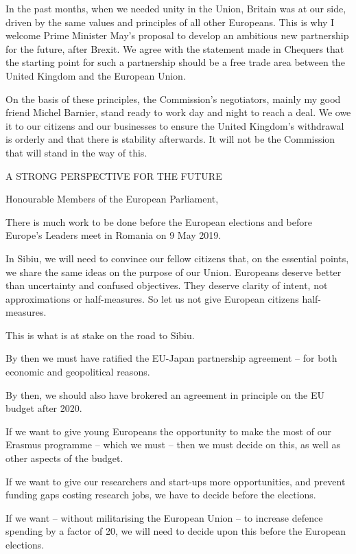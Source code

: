 \documentclass[a4paper,11pt]{article}
\begin{document}
In the past months, when we needed unity in the Union, Britain was at our side, driven by the same values and principles of all other Europeans. This is why I welcome Prime Minister May's proposal to develop an ambitious new partnership for the future, after Brexit. We agree with the statement made in Chequers that the starting point for such a partnership should be a free trade area between the United Kingdom and the European Union.

On the basis of these principles, the Commission's negotiators, mainly my good friend Michel Barnier, stand ready to work day and night to reach a deal. We owe it to our citizens and our businesses to ensure the United Kingdom's withdrawal is orderly and that there is stability afterwards. It will not be the Commission that will stand in the way of this.

 

A STRONG PERSPECTIVE FOR THE FUTURE

Honourable Members of the European Parliament,

There is much work to be done before the European elections and before Europe's Leaders meet in Romania on 9 May 2019.

In Sibiu, we will need to convince our fellow citizens that, on the essential points, we share the same ideas on the purpose of our Union. Europeans deserve better than uncertainty and confused objectives. They deserve clarity of intent, not approximations or half-measures. So let us not give European citizens half-measures.

This is what is at stake on the road to Sibiu.

By then we must have ratified the EU-Japan partnership agreement – for both economic and geopolitical reasons.

By then, we should also have brokered an agreement in principle on the EU budget after 2020.

If we want to give young Europeans the opportunity to make the most of our Erasmus programme – which we must – then we must decide on this, as well as other aspects of the budget.

If we want to give our researchers and start-ups more opportunities, and prevent funding gaps costing research jobs, we have to decide before the elections.

If we want – without militarising the European Union – to increase defence spending by a factor of 20, we will need to decide upon this before the European elections.
\end{document}
